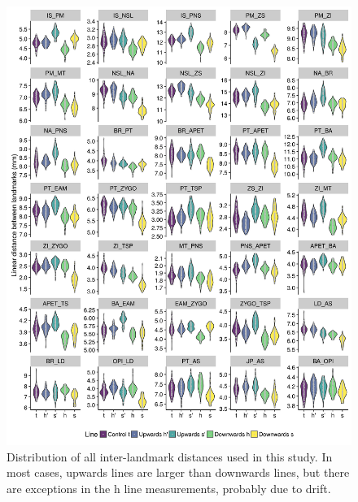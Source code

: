 \begin{refsection}
\begin{figure}
    \centering
    \includegraphics[width=\linewidth]{chapter_ratones/media/SI/figureS6.png}
    \caption[Distributions of cranial distances]{Distribution of all inter-landmark distances used in this
        study. In most cases, upwards lines are larger than downwards lines, but
        there are exceptions in the h line measurements, probably due to
        drift.}
    \label{figsup:traits}
\end{figure}


\end{refsection}
